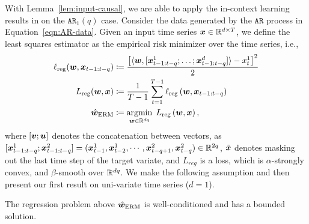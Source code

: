 With Lemma~\ref{lem:input-causal}, we are able to apply the in-context learning results in \cite{bai2024transformers} on the $\mathtt{AR}_1(q)$ case.
Consider the data generated by the $\mathtt{AR}$ process in Equation~\ref{eqn:AR-data}.
Given an input time series $\bm{x} \in \mathbb{R}^{ d \times T}$, we define the least squares estimator as the empirical risk minimizer over the time series, i.e.,
{\small
\begin{align*}
    \ell_{\text{reg}}(\bm{w}, \bm{x}_{t-1:t-q}  )
    &\coloneqq
    \frac{
    \left[
    \langle
    \bm{w} ,
    [ \bm{x}^1_{t-1:t-q} ; \dots ; \bm{x}^d_{t-1:t-q}]
    \rangle
    -
    x_t^1
    \right]^2
    }{2}
    \\
    L_{\text{reg}}
    (\bm{w}, \bm{x})
    &\coloneqq
    \frac{1}{T-1}
    \sum_{t=1}^{T-1}
    \ell_{\text{reg}}
    \left(
    \bm{w}, \bm{x}_{t-1:t-q}
    \right)
    \\
    \hat{\bm{w}}_{\text{ERM}} 
    &\coloneqq
    \mathop{\mathrm{argmin}}_{\bm{w}\in\mathbb{R}^{dq}}
    \;
    L_{\text{reg}}
    \left(
    \bm{w}, \bm{x}
    \right),
\end{align*}
}
where $[ \bm{v} ; \bm{u}]$ denotes the concatenation between vectors, as $[\bm{x}^1_{t-1:t-q} ; \bm{x}^2_{t-1:t-q}] = ( \bm{x}^1_{t-1},  \bm{x}^1_{t-2},  \cdots, \bm{x}^2_{t-q+1}, \bm{x}^2_{t-q} ) \in \mathbb{R}^{2q}$, $\tilde{\bm{x}}$ denotes masking out the last time step of the target variate, and $L_{reg}$ is a loss, which is $\alpha$-strongly convex, and $\beta$-smooth over $\mathbb{R}^{dq}$.
We make the following assumption and then present our first result on uni-variate time series ($d=1$).
\begin{assumption}\label{assumption:effective-regression}
    The regression problem above $\hat{\bm{w}}_{\text{ERM}}$ is well-conditioned and has a bounded solution.
\end{assumption}
